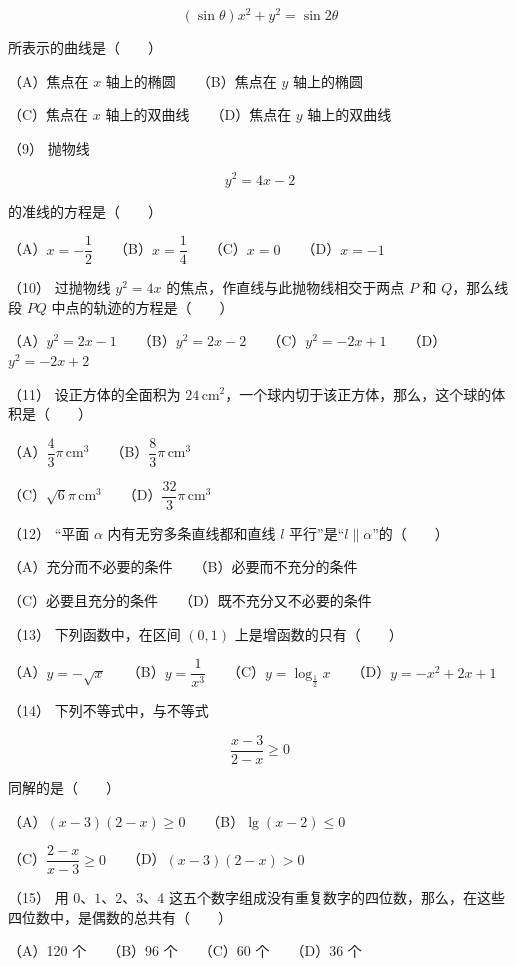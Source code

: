 \begin{question}
\nopagebreak[4]
\[
(\sin\theta)x^2+y^2=\sin2\theta
\]

所表示的曲线是\mbox{（　　）}

（A）焦点在 $x$ 轴上的椭圆　　（B）焦点在 $y$ 轴上的椭圆

（C）焦点在 $x$ 轴上的双曲线　　（D）焦点在 $y$ 轴上的双曲线

（9） 抛物线

\nopagebreak[4]
\[
y^2=4x-2
\]

的准线的方程是\mbox{（　　）}

（A）$x=-\dfrac12$　　（B）$x=\dfrac14$　　（C）$x=0$　　（D）$x=-1$

（10） 过抛物线 $y^2=4x$ 的焦点，作直线与此抛物线相交于两点 $P$ 和 $Q$，那么线段 $PQ$ 中点的轨迹的方程是\mbox{（　　）}

（A）$y^2=2x-1$　　（B）$y^2=2x-2$　　（C）$y^2=-2x+1$　　（D）$y^2=-2x+2$

（11） 设正方体的全面积为 $24\,\mathrm{cm}^2$，一个球内切于该正方体，那么，这个球的体积是\mbox{（　　）}

（A）$\dfrac43\pi\,\mathrm{cm}^3$　　（B）$\dfrac83\pi\,\mathrm{cm}^3$

（C）$\sqrt6\pi\,\mathrm{cm}^3$　　（D）$\dfrac{32}3\pi\,\mathrm{cm}^3$

（12） “平面 $\alpha$ 内有无穷多条直线都和直线 $l$ 平行”是“$l\parallel\alpha$”的\mbox{（　　）}

（A）充分而不必要的条件　　（B）必要而不充分的条件

（C）必要且充分的条件　　（D）既不充分又不必要的条件

（13） 下列函数中，在区间 $(0,1)$ 上是增函数的只有\mbox{（　　）}

（A）$y=-\sqrt{x}$　　（B）$y=\dfrac1{x^3}$　　（C）$y=\log_{\frac12}x$　　（D）$y=-x^2+2x+1$

（14） 下列不等式中，与不等式

\nopagebreak[4]
\[
\frac{x-3}{2-x}\geq0
\]

同解的是\mbox{（　　）}

（A）$(x-3)(2-x)\geq0$　　（B）$\lg(x-2)\leq0$

（C）$\dfrac{2-x}{x-3}\geq0$　　（D）$(x-3)(2-x)>0$

（15） 用 $0\text{、}1\text{、}2\text{、}3\text{、}4$ 这五个数字组成没有重复数字的四位数，那么，在这些四位数中，是偶数的总共有\mbox{（　　）}

（A）120 个　　（B）96 个　　（C）60 个　　（D）36 个


\end{question}
